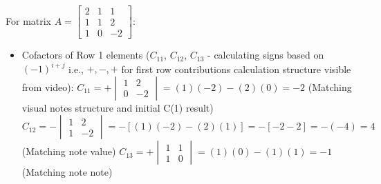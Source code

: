 \documentclass{article}
\begin{document}
For matrix $A = \begin{bmatrix} 2 & 1 & 1 \\ 1 & 1 & 2 \\ 1 & 0 & -2 \end{bmatrix}$:
\begin{itemize}
    \item Cofactors of Row 1 elements ($C_{11}$, $C_{12}$, $C_{13}$ - calculating signs based on $(-1)^{i+j}$ i.e., $+,-,+$ for first row contributions calculation structure visible from video):
    $C_{11} = + \begin{vmatrix} 1 & 2 \\ 0 & -2 \end{vmatrix} = (1)(-2)-(2)(0)= -2$ (Matching visual notes structure and initial C(1) result)
    $C_{12} = - \begin{vmatrix} 1 & 2 \\ 1 & -2 \end{vmatrix} = -[(1)(-2) - (2)(1)] = -[-2-2] = -(-4) = 4$ (Matching note value)
    $C_{13} = + \begin{vmatrix} 1 & 1 \\ 1 & 0 \end{vmatrix} = (1)(0) - (1)(1) = -1$ (Matching note note)


\end{itemize}
\end{document}
